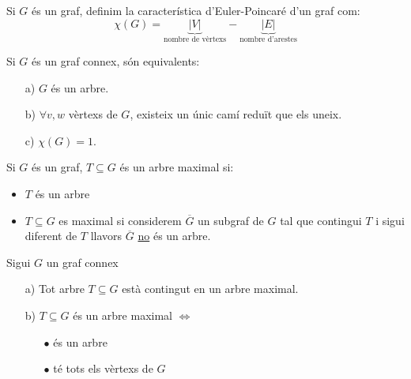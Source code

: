 \documentclass[../main.tex]{subfiles}
\begin{document}
    \begin{definicio}
        Si $G$ és un graf, definim la característica d'Euler-Poincaré d'un graf com:
        \begin{displaymath}
            \chi\left(G\right) = \underbrace{\left\lvert V \right\rvert}_\text{nombre de vèrtexs} - \underbrace{\left\lvert E \right\rvert}_\text{nombre d'arestes}
        \end{displaymath}
    \end{definicio}
    \begin{teorema}
        Si $G$ és un graf connex, són equivalents:
        \begin{itemize}
            \item[a)] $G$ és un arbre.
            \item[b)] $\forall v, w$ vèrtexs de $G$, existeix un únic camí reduït que els uneix.
            \item[c)] $\chi(G) = 1$. 
        \end{itemize}
    \end{teorema}
    \begin{definicio}
        Si $G$ és un graf, $T \subseteq G$ és un arbre maximal si:
        \begin{itemize}
            \item $T$ és un arbre
            \item $T \subseteq G$ es maximal si considerem $\overline{G}$ un subgraf de $G$ tal que
            contingui $T$ i sigui diferent de $T$ llavors $\overline{G}$ \underline{no} és un arbre.
        \end{itemize}
    \end{definicio}
    \begin{proposicio}
        Sigui $G$ un graf connex
        \begin{itemize}
            \item[a)] Tot arbre $T \subseteq G$ està contingut en un arbre maximal.
            \item[b)] $T \subseteq G$ és un arbre maximal $\Leftrightarrow$
            \begin{itemize}
                \item[$\bullet$] és un arbre
                \item[$\bullet$] té tots els vèrtexs de $G$
            \end{itemize}
        \end{itemize}
    \end{proposicio}
\end{document}
